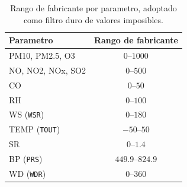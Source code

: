 \begin{table}[pos=t]
  \centering
  \caption{Rango de fabricante por parametro, adoptado como filtro duro de
    valores imposibles.}
  \label{tab:dic-fabricante}
  \small
  \begin{tabular}{lc}
    \toprule
    Parametro & Rango de fabricante \\
    \midrule
    PM10, PM2.5, O3      & $0$--$1000$     \\
    NO, NO2, NOx, SO2    & $0$--$500$      \\
    CO                   & $0$--$50$       \\
    RH                   & $0$--$100$      \\
    WS (\texttt{WSR})    & $0$--$180$      \\
    TEMP (\texttt{TOUT}) & $-50$--$50$     \\
    SR                   & $0$--$1.4$      \\
    BP (\texttt{PRS})    & $449.9$--$824.9$\\
    WD (\texttt{WDR})    & $0$--$360$      \\
    \bottomrule
  \end{tabular}
\end{table}

